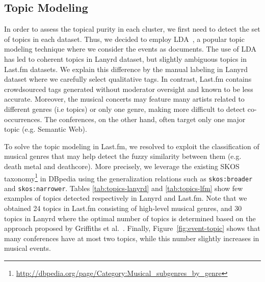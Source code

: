 \subsection{Topic Modeling}
In order to assess the topical purity in each cluster, we first need to detect the set of topics in each dataset. Thus, we decided to employ LDA~\cite{Blei:MLR03}, a popular topic modeling technique where we consider the events as documents. The use of LDA has led to coherent topics in Lanyrd dataset, but slightly ambiguous topics in Last.fm datasets. We explain this difference by the manual labeling in Lanyrd dataset where we carefully select qualitative tags. In contrast, Last.fm contains crowdsourced tags generated without moderator oversight and known to be less accurate. Moreover, the musical concerts may feature many artists related to different genres (i.e topics) or only one genre, making more difficult to detect co-occurrences. The conferences, on the other hand,  often target only one major topic (e.g. Semantic Web). 

To solve the topic modeling in Last.fm, we resolved to exploit the classification of musical genres that may help detect the fuzzy similarity between them (e.g. death metal and deathcore). More precisely, we leverage the existing SKOS taxonomy\footnote{\url{http://dbpedia.org/page/Category:Musical_subgenres_by_genre}} in DBpedia using the generalization relations such as \texttt{skos:broader} and \texttt{skos:narrower}. Tables \ref{tab:topics-lanyrd} and \ref{tab:topics-lfm} show few examples of topics detected respectively in Lanyrd and Last.fm. Note that we obtained 24 topics in Last.fm consisting of high-level musical genres, and 30 topics in Lanyrd where the optimal number of topics is determined based on the approach proposed by Griffiths et al.~\cite{Griffiths:04}. Finally, Figure~\ref{fig:event-topic} shows that many conferences have at most two topics, while this number slightly increases in musical events. 

\begin{table}[H]
\end{table}

